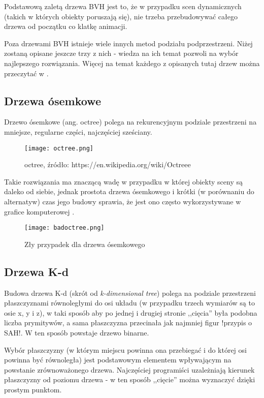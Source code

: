 Podstawową zaletą drzewa BVH jest to, że w przypadku scen dynamicznych (takich w których obiekty poruszają się), nie trzeba przebudowywać całego drzewa od początku co klatkę animacji.


Poza drzewami BVH istnieje wiele innych metod podziału podprzestrzeni. Niżej zostaną opisane jeszcze trzy z nich - wiedza na ich temat pozwoli na wybór najlepszego rozwiązania. Więcej na temat każdego z opisanych tutaj drzew można przeczytać w \cite{trees, dunn02}.

\subsection{Drzewa ósemkowe}

Drzewo ósemkowe (ang. octree) polega na rekurencyjnym podziale przestrzeni na mniejsze, regularne części, najczęściej sześciany.

\begin{figure}[h!]
\centering
  \caption{octree, źródło: https://en.wikipedia.org/wiki/Octreee}
  \texttt{[image: octree.png]}
\end{figure}

Takie rozwiązania ma znaczącą wadę w przypadku w której obiekty sceny są daleko od siebie, jednak prostota drzewa ósemkowego i krótki (w porównaniu do alternatyw) czas jego budowy sprawia, że jest ono często wykorzystywane w grafice komputerowej \cite{octree1, octree2}.

\begin{figure}[h!]
\centering
  \caption{Zły przypadek dla drzewa ósemkowego}
  \texttt{[image: badoctree.png]}
\end{figure}

\subsection{Drzewa K-d}

Budowa drzewa K-d (skrót od \emph{k-dimensional tree}) polega na podziale przestrzeni płaszczyznami równoległymi do osi układu (w przypadku trzech wymiarów są to osie x, y i z), w taki sposób aby po jednej i drugiej stronie ,,cięcia'' była podobna liczba prymitywów, a sama płaszczyzna przecinała jak najmniej figur !przypis o SAH!. W ten sposób powstaje drzewo binarne.

Wybór płaszczyzny (w którym miejscu powinna ona przebiegać i do której osi powinna być równoległa) jest podstawowym elementem wpływającym na powstanie zrównoważonego drzewa. Najczęściej programiści uzależniają kierunek płaszczyzny od poziomu drzewa - w ten sposób ,,cięcie'' można wyznaczyć dzięki prostym punktom.

